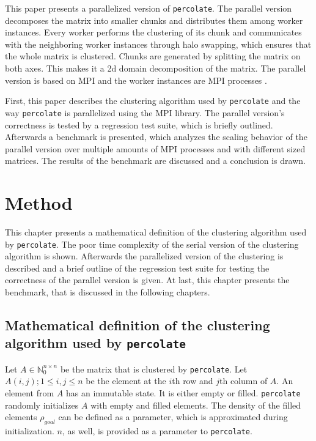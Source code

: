 \documentclass[twoside,11pt]{article}
\def\perc{\texttt{perco\-late}}
\begin{document}
This paper presents a parallelized version of \perc{}.
The parallel version decomposes the matrix into smaller
chunks and distributes them among worker instances.
Every worker performs the clustering of its chunk and
communicates with the neighboring worker
instances through halo swapping, which ensures that the
whole matrix is clustered.
Chunks are generated by splitting the matrix on both axes.
This makes it a 2d domain decomposition of the matrix.
The parallel version is based on MPI and the worker
instances are MPI processes \citep[see][]{mpi}.

First, this paper describes the clustering algorithm used
by \perc{} and the way \perc{} is parallelized using the
MPI library.
The parallel version's correctness is tested by a
regression test suite, which is briefly outlined.
Afterwards a benchmark is presented, which analyzes the
scaling behavior of the parallel version over multiple
amounts of MPI processes and with different sized matrices.
The results of the benchmark are discussed and a conclusion
is drawn.


\section{Method} %

This chapter presents a mathematical definition of the
clustering algorithm used by \perc{}.
The poor time complexity of the serial version of the
clustering algorithm is shown.
Afterwards the parallelized version of the clustering is
described and a brief outline of the regression test suite
for testing the correctness of the parallel version is
given.
At last, this chapter presents the benchmark, that is
discussed in the following chapters.


\subsection{Mathematical definition of the clustering
  algorithm used by \perc{}}

Let $A \in \mathbb{N}_0^{n \times n}$ be the matrix that
is clustered by \perc{}.
Let $A(i, j);1\leq i, j \leq n$ be the element at the
$i$th row and $j$th column of $A$.
An element from $A$ has an immutable state. It is either
empty or filled.
\perc{} randomly initializes $A$ with empty and filled
elements.
The density of the filled elements $\rho_{goal}$ can be
defined as a parameter, which is approximated during
initialization. $n$, as well, is provided as a parameter to
\perc{}.
\end{document}
